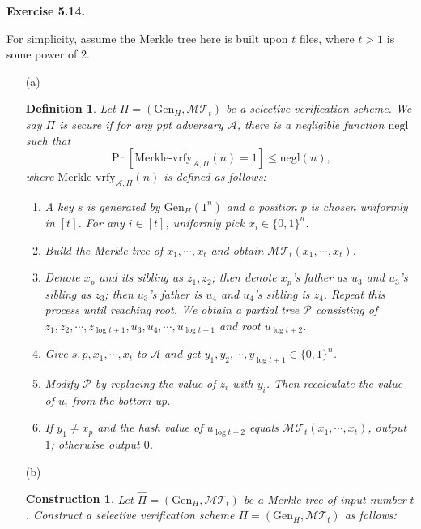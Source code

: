 \documentclass[a4paper]{article}
\newtheorem{definition}{Definition}
\newtheorem{construction}{Construction}
\newenvironment{exercise}[1]{
	\par
	\noindent\textbf{Exercise #1.}\quad
}{
	\par
	\bigskip
}
\newcommand{\sbra}[1]{\left[ #1 \right]}
\newcommand{\bin}{\{0,1\}}
\newcommand{\Gen}{\mathrm{Gen}}
\newcommand{\negl}{\mathrm{negl}}
\newcommand{\ppt}{{\sc ppt} }
\newcommand{\Acal}{\mathcal{A}}
\newcommand{\Pcal}{\mathcal{P}}
\begin{document}
\begin{exercise}{5.14}
For simplicity, assume the Merkle tree here is built upon $t$ files, where $t>1$ is some power of $2$.
\begin{itemize}
    \item[(a)]
        \begin{definition}
            Let $\Pi=(\Gen_H,\mathcal{MT}_t)$ be a selective verification scheme.
            We say $\Pi$ is secure if for any \ppt adversary $\Acal$, 
            there is a negligible function $\negl$ such that
            $$
            \Pr\sbra{\mathrm{Merkle\text{-}vrfy}_{\Acal,\Pi}(n)=1}\leq\negl(n),
            $$
            where $\mathrm{Merkle\text{-}vrfy}_{\Acal,\Pi}(n)$ is defined as follows:
            \begin{enumerate}
                \item A key $s$ is generated by $\Gen_H(1^n)$ and a position $p$ is chosen uniformly in $[t]$.
                    For any $i\in[t]$, uniformly pick $x_i\in\bin^n$.
                \item Build the Merkle tree of $x_1,\cdots,x_t$ and obtain $\mathcal{MT}_t(x_1,\cdots,x_t)$.
                \item Denote $x_p$ and its sibling as $z_1,z_2$; then denote $x_p$'s father as $u_3$ 
                    and $u_3$'s sibling as $z_3$; then $u_3$'s father is $u_4$ and $u_4$'s sibling is $z_4$. 
                    Repeat this process until reaching root. We obtain a partial tree $\Pcal$
                    consisting of $z_1,z_2,\cdots,z_{\log t+1},u_3,u_4,\cdots,u_{\log t+1}$ and root $u_{\log t+2}$.
                \item Give $s,p,x_1,\cdots,x_t$ to $\Acal$ and get $y_1,y_2,\cdots,y_{\log t+1}\in\bin^n$.
                \item Modify $\Pcal$ by replacing the value of $z_i$ with $y_i$. 
                    Then recalculate the value of $u_i$ from the bottom up.
                \item If $y_1\neq x_p$ and the hash value of $u_{\log t+2}$ equals $\mathcal{MT}_t(x_1,\cdots,x_t)$,
                    output $1$; otherwise output $0$.
            \end{enumerate}
        \end{definition}
    \item[(b)]
        \begin{construction}
            Let $\widehat\Pi=(\Gen_H,\mathcal{MT}_t)$ be a Merkle tree of input number $t$.
            Construct a selective verification scheme $\Pi=(\Gen_H,\mathcal{MT}_t)$ as follows:

\end{construction}
\end{itemize}
\end{exercise}
\end{document}
